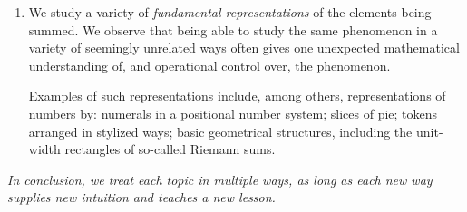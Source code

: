 \begin{enumerate}
\item
We study a variety of {\it fundamental representations} of the elements being summed.  We observe that being able to study the same phenomenon in a variety of seemingly unrelated ways often gives one unexpected mathematical understanding of, and operational control over, the phenomenon.

\smallskip

Examples of such representations include, among others, representations of numbers by: numerals in a positional number system; slices of pie; tokens arranged in stylized ways; basic geometrical structures, including the unit-width rectangles of so-called Riemann sums.
\end{enumerate}

\medskip

\noindent
{\em In conclusion, we treat each topic in multiple ways, as long as each new way supplies new intuition and teaches a new lesson.}

\bigskip





